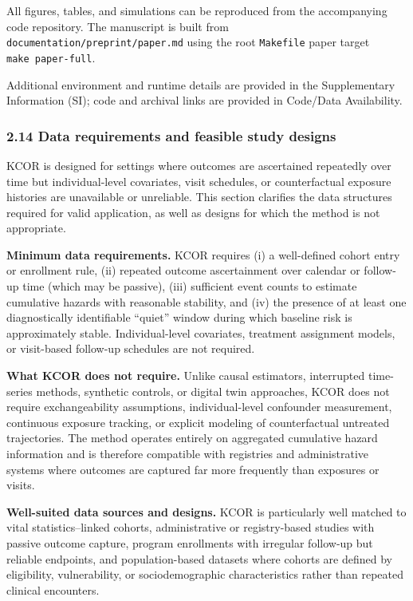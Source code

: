 \documentclass[
]{article}
\begin{document}
All figures, tables, and simulations can be reproduced from the
accompanying code repository. The manuscript is built from
\texttt{documentation/preprint/paper.md} using the root
\texttt{Makefile} paper target \texttt{make\ paper-full}.

Additional environment and runtime details are provided in the
Supplementary Information (SI); code and archival links are provided in
Code/Data Availability.

\subsubsection{2.14 Data requirements and feasible study
designs}\label{data-requirements-and-feasible-study-designs}

KCOR is designed for settings where outcomes are ascertained repeatedly
over time but individual-level covariates, visit schedules, or
counterfactual exposure histories are unavailable or unreliable. This
section clarifies the data structures required for valid application, as
well as designs for which the method is not appropriate.

\textbf{Minimum data requirements.} KCOR requires (i) a well-defined
cohort entry or enrollment rule, (ii) repeated outcome ascertainment
over calendar or follow-up time (which may be passive), (iii) sufficient
event counts to estimate cumulative hazards with reasonable stability,
and (iv) the presence of at least one diagnostically identifiable
``quiet'' window during which baseline risk is approximately stable.
Individual-level covariates, treatment assignment models, or visit-based
follow-up schedules are not required.

\textbf{What KCOR does not require.} Unlike causal estimators,
interrupted time-series methods, synthetic controls, or digital twin
approaches, KCOR does not require exchangeability assumptions,
individual-level confounder measurement, continuous exposure tracking,
or explicit modeling of counterfactual untreated trajectories. The
method operates entirely on aggregated cumulative hazard information and
is therefore compatible with registries and administrative systems where
outcomes are captured far more frequently than exposures or visits.

\textbf{Well-suited data sources and designs.} KCOR is particularly well
matched to vital statistics--linked cohorts, administrative or
registry-based studies with passive outcome capture, program enrollments
with irregular follow-up but reliable endpoints, and population-based
datasets where cohorts are defined by eligibility, vulnerability, or
sociodemographic characteristics rather than repeated clinical
encounters.
\end{document}
